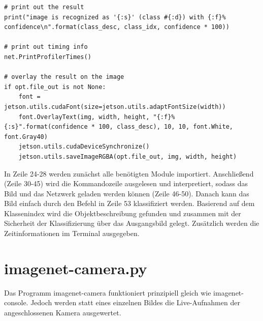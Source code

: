 \begin{lstlisting}
# print out the result
print("image is recognized as '{:s}' (class #{:d}) with {:f}% confidence\n".format(class_desc, class_idx, confidence * 100))

# print out timing info
net.PrintProfilerTimes()

# overlay the result on the image
if opt.file_out is not None:
	font = jetson.utils.cudaFont(size=jetson.utils.adaptFontSize(width))	
	font.OverlayText(img, width, height, "{:f}% {:s}".format(confidence * 100, class_desc), 10, 10, font.White, font.Gray40)
	jetson.utils.cudaDeviceSynchronize()
	jetson.utils.saveImageRGBA(opt.file_out, img, width, height)

\end{lstlisting}

In Zeile 24-28 werden zunächst alle benötigten Module importiert.
Anschließend (Zeile 30-45) wird die Kommandozeile ausgelesen und interpretiert,
sodass das Bild und das Netzwerk geladen werden können (Zeile 46-50).
Danach kann das Bild einfach durch den Befehl in Zeile 53 klassifiziert werden.
Basierend auf dem Klassenindex wird die Objektbeschreibung gefunden und zusammen
mit der Sicherheit der Klassifizierung über das Ausgangsbild gelegt.
Zusätzlich werden die Zeitinformationen im Terminal ausgegeben.


\section{imagenet-camera.py}

Das Programm imagenet-camera funktioniert prinzipiell gleich wie imagenet-console. Jedoch werden statt eines einzelnen Bildes die Live-Aufnahmen der angeschlossenen Kamera ausgewertet.

